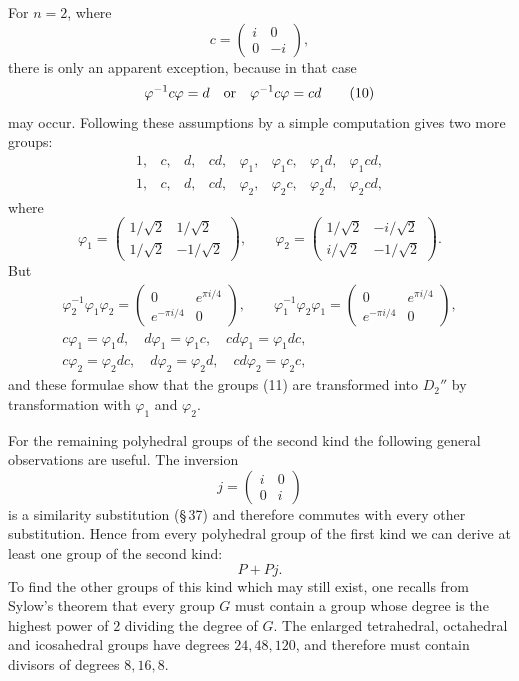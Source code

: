 \documentclass[11pt]{article}
\begin{document}
For $n=2$, where
\[
 c=\begin{pmatrix}i&0\\0&-i\end{pmatrix},
\]
there is only an apparent exception, because in that case
\begin{equation}
 \varphi^{-1}c\varphi=d\quad \hbox{or}\quad
 \varphi^{-1}c\varphi=cd \tag{10}
\end{equation}
may occur. Following these assumptions by a simple computation gives two more groups:
\begin{equation}
\begin{array}{cccccccc}
1,&c,&d,&cd,&\varphi_1,&\varphi_1c,&\varphi_1d,&\varphi_1cd,\\
1,&c,&d,&cd,&\varphi_2,&\varphi_2c,&\varphi_2d,&\varphi_2cd,
\end{array} \tag{11}
\end{equation}
where
\[
 \varphi_1=\begin{pmatrix}1/\sqrt2&1/\sqrt2\\1/\sqrt2&-1/\sqrt2\end{pmatrix},\qquad
 \varphi_2=\begin{pmatrix}1/\sqrt2&-i/\sqrt2\\i/\sqrt2&-1/\sqrt2\end{pmatrix}.
\]
But
\[
\begin{gathered}
 \varphi_2^{-1}\varphi_1\varphi_2=
 \begin{pmatrix}0&e^{\pi i/4}\\ e^{-\pi i/4}&0\end{pmatrix},\qquad
 \varphi_1^{-1}\varphi_2\varphi_1=
 \begin{pmatrix}0&e^{\pi i/4}\\ e^{-\pi i/4}&0\end{pmatrix},\\
 c\varphi_1=\varphi_1d,\quad d\varphi_1=\varphi_1c,\quad
 cd\varphi_1=\varphi_1dc,\\
 c\varphi_2=\varphi_2dc,\quad d\varphi_2=\varphi_2d,\quad
 cd\varphi_2=\varphi_2c,
\end{gathered}
\]
and these formulae show that the groups (11) are transformed into $D_2''$ by transformation with $\varphi_1$ and $\varphi_2$.

For the remaining polyhedral groups of the second kind the following general observations are useful. The inversion
\[
 j=\begin{pmatrix}i&0\\0&i\end{pmatrix}
\]
is a similarity substitution (\S\,37) and therefore commutes with every other substitution. Hence from every polyhedral group of the first kind we can derive at least one group of the second kind:
\begin{equation}
 P+Pj. \tag{12}
\end{equation}
To find the other groups of this kind which may still exist, one recalls from Sylow's theorem that every group $G$ must contain a group whose degree is the highest power of $2$ dividing the degree of $G$. The enlarged tetrahedral, octahedral and icosahedral groups have degrees $24,48,120$, and therefore must contain divisors of degrees $8,16,8$.
\end{document}
